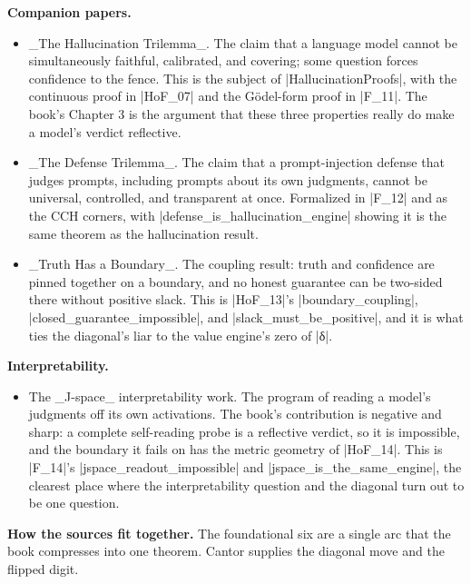 \documentclass{memoir}
\begin{document}
\textbf{Companion papers.}

\begin{itemize}
\item \_The Hallucination Trilemma\_. The claim that a language model cannot be
   simultaneously faithful, calibrated, and covering; some question forces
   confidence to the fence. This is the subject of \LeanVerb|HallucinationProofs|, with the
   continuous proof in \LeanVerb|HoF_07| and the Gödel-form proof in \LeanVerb|F_11|. The book's
   Chapter 3 is the argument that these three properties really do make a model's
   verdict reflective.
\item \_The Defense Trilemma\_. The claim that a prompt-injection defense that judges
   prompts, including prompts about its own judgments, cannot be universal,
   controlled, and transparent at once. Formalized in \LeanVerb|F_12| and as the CCH corners,
   with \LeanVerb|defense_is_hallucination_engine| showing it is the same theorem as the
   hallucination result.
\item \_Truth Has a Boundary\_. The coupling result: truth and confidence are pinned
   together on a boundary, and no honest guarantee can be two-sided there without
   positive slack. This is \LeanVerb|HoF_13|'s \LeanVerb|boundary_coupling|,
   \LeanVerb|closed_guarantee_impossible|, and \LeanVerb|slack_must_be_positive|, and it is what ties
   the diagonal's liar to the value engine's zero of \LeanVerb|δ|.

\end{itemize}


\textbf{Interpretability.}

\begin{itemize}
\item The \_J-space\_ interpretability work. The program of reading a model's judgments
   off its own activations. The book's contribution is negative and sharp: a
   complete self-reading probe is a reflective verdict, so it is impossible, and the
   boundary it fails on has the metric geometry of \LeanVerb|HoF_14|. This is \LeanVerb|F_14|'s
   \LeanVerb|jspace_readout_impossible| and \LeanVerb|jspace_is_the_same_engine|, the clearest place
   where the interpretability question and the diagonal turn out to be one question.

\end{itemize}


\textbf{How the sources fit together.} The foundational six are a single arc that the book
compresses into one theorem. Cantor supplies the diagonal move and the flipped
digit.
\end{document}
